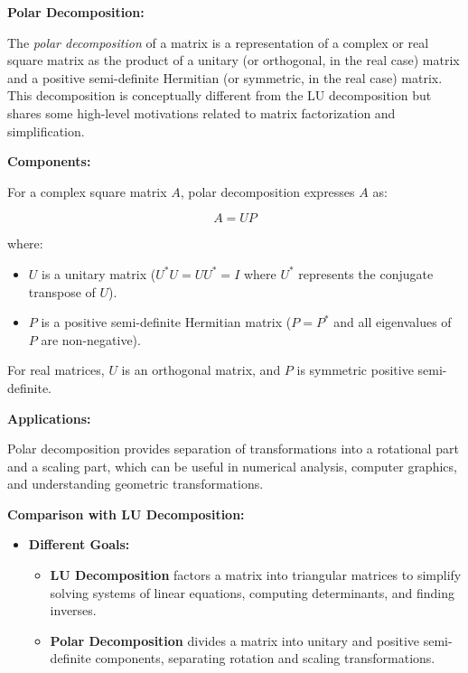 \begin{airesult}
\textbf{Polar Decomposition:}

The \textit{polar decomposition} of a matrix is a representation of a complex or real square matrix
as the product of a unitary (or orthogonal, in the real case) matrix and a positive semi-definite
Hermitian (or symmetric, in the real case) matrix. This decomposition is conceptually different from
the LU decomposition but shares some high-level motivations related to matrix factorization and
simplification.

\vsp

\textbf{Components:}

For a complex square matrix \(A\), polar decomposition expresses \(A\) as:

\[
A = UP
\]

where:
\begin{itemize}
  \item \(U\) is a unitary matrix (\(U^*U = UU^* = I\) where \(U^*\) represents the conjugate
transpose of \(U\)).
  \item \(P\) is a positive semi-definite Hermitian matrix (\(P = P^*\) and all eigenvalues of \(P\)
are non-negative).
\end{itemize}

For real matrices, \(U\) is an orthogonal matrix, and \(P\) is symmetric positive semi-definite.

\vsp

\textbf{Applications:}

Polar decomposition provides separation of transformations into a rotational part and a scaling
part, which can be useful in numerical analysis, computer graphics, and understanding geometric
transformations.

\vsp

\textbf{Comparison with LU Decomposition:}

\begin{itemize}
  \item \textbf{Different Goals:}
  \begin{itemize}
    \item \textbf{LU Decomposition} factors a matrix into triangular matrices to simplify solving
systems of linear equations, computing determinants, and finding inverses.
    \item \textbf{Polar Decomposition} divides a matrix into unitary and positive semi-definite
components, separating rotation and scaling transformations.
  \end{itemize}


\end{itemize}
\end{airesult}
